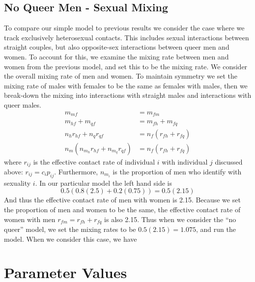 \documentclass[12pt]{article}
\begin{document}

\subsection{No Queer Men - Sexual Mixing}

To compare our simple model to previous results we consider the case where we track exclusively heterosexual contacts.  This includes sexual interactions between straight couples, but also opposite-sex interactions between queer men and women. To account for this, we examine the mixing rate between men and women from the previous model, and set this to be the mixing rate.  We consider the overall mixing rate of men and women. To maintain symmetry we set the mixing rate of males with females to be the same as females with males, then we break-down the mixing into interactions with straight males and interactions with queer males.
\begin{align}
m_{mf} &= m_{fm}\\
m_{hf} + m_{qf} &= m_{fh} + m_{fq}\\
n_hr_{hf} + n_qr_{qf} &= n_f(r_{fh} + r_{fq})\\
n_m(n_{m_h}r_{hf} + n_{m_q}r_{qf}) &= n_f(r_{fh} + r_{fq})
\end{align}
where $r_{ij}$ is the effective contact rate of individual $i$ with individual $j$ discussed above: $r_{ij}=c_ip_{ij}$.  Furthermore, $n_{m_i}$ is the proportion of men who identify with sexuality $i$.  In our particular model the left hand side is 
\begin{equation}
0.5(0.8(2.5) + 0.2(0.75)) = 0.5(2.15)
\end{equation}
And thus the effective contact rate of men with women is 2.15.  Because we set the proportion of men and women to be the same, the effective contact rate of women with men $r_{fm}=r_{fh}+r_{fq}$ is also 2.15.  Thus when we consider the ``no queer'' model, we set the mixing rates to be $0.5(2.15) = 1.075$, and run the model.  When we consider this case, we have 


\section*{Parameter Values}
\end{document}
